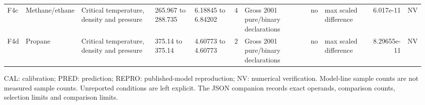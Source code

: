 \begin{landscape}
\begin{longtable}{L{1.9cm}L{2.5cm}L{2.1cm}L{1.6cm}L{1.6cm}rL{2.4cm}L{1.9cm}L{2.2cm}rL{1cm}}
F4c & Methane/\allowbreak{}ethane & Critical temperature, density and pressure & 265.967 to 288.735 & 6.18845 to 6.84202 & 4 & Gross 2001 pure/\allowbreak{}binary declarations & no & max scaled difference & 6.017e-\allowbreak{}11 & NV \\
F4d & Propane & Critical temperature, density and pressure & 375.14 to 375.14 & 4.60773 to 4.60773 & 2 & Gross 2001 pure/\allowbreak{}binary declarations & no & max scaled difference & 8.29655e-\allowbreak{}11 & NV \\
\bottomrule\end{longtable}
CAL: calibration; PRED: prediction; REPRO: published-model reproduction; NV: numerical verification. Model-line sample counts are not measured sample counts. Unreported conditions are left explicit. The JSON companion records exact operands, comparison counts, selection limits and comparison limits.
\endgroup\end{landscape}
